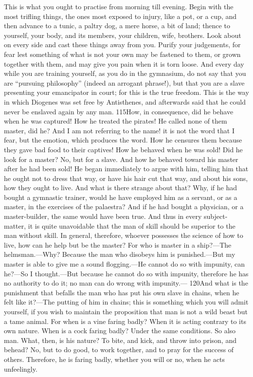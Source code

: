 This is what you ought to practise from morning till evening. Begin with the most trifling things, the ones most exposed to injury, like a pot, or a cup, and then advance to a tunic, a paltry dog, a mere horse, a bit of land; thence to yourself, your body, and its members, your children, wife, brothers. Look about on every side and cast these things away from you. Purify your judgements, for fear lest something of what is not your own may be fastened to them, or grown together with them, and may give you pain when it is torn loose. And every day while you are training yourself, as you do in the gymnasium, do not say that you are ``pursuing philosophy'' (indeed an arrogant phrase!), but that you are a slave presenting your emancipator in court; for this is the true freedom. This is the way in which Diogenes was set free by Antisthenes, and afterwards said that he could never be enslaved again by any man. 115How, in consequence, did he behave when he was captured! How he treated the pirates! He called none of them master, did he? And I am not referring to the name! it is not the word that I fear, but the emotion, which produces the word. How he censures them because they gave bad food to their captives! How he behaved when he was sold! Did he look for a master? No, but for a slave. And how he behaved toward his master after he had been sold! He began immediately to argue with him, telling him that he ought not to dress that way, or have his hair cut that way, and about his sons, how they ought to live. And what is there strange about that? Why, if he had bought a gymnastic trainer, would he have employed him as a servant, or as a master, in the exercises of the palaestra? And if he had bought a physician, or a master-builder, the same would have been true. And thus in every subject-matter, it is quite unavoidable that the man of skill should be superior to the man without skill. In general, therefore, whoever possesses the science of how to live, how can he help but be the master? For who is master in a ship?—The helmsman.—Why? Because the man who disobeys him is punished.—But my master is able to give me a sound flogging.—He cannot do so with impunity, can he?—So I thought.—But because he cannot do so with impunity, therefore he has no authority to do it; no man can do wrong with impunity.— 120And what is the punishment that befalls the man who has put his own slave in chains, when he felt like it?—The putting of him in chains; this is something which you will admit yourself, if you wish to maintain the proposition that man is not a wild beast but a tame animal. For when is a vine faring badly? When it is acting contrary to its own nature. When is a cock faring badly? Under the same conditions. So also man. What, then, is his nature? To bite, and kick, and throw into prison, and behead? No, but to do good, to work together, and to pray for the success of others. Therefore, he is faring badly, whether you will or no, when he acts unfeelingly.

